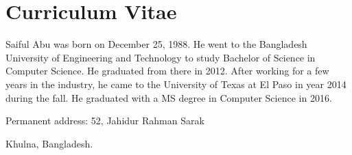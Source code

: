 
\chapter*{Curriculum Vitae}

Saiful Abu was born on December 25, 1988. He went to the Bangladesh University of Engineering and Technology to study Bachelor of Science in Computer Science. He graduated from there in 2012. After working for a few years in the industry, he came to the University of Texas at El Paso in year 2014 during the fall. He graduated with a MS degree in Computer Science in 2016.



\medskip

\noindent
Permanent address: 52, Jahidur Rahman Sarak

\noindent
\hspace{1.42in}
Khulna, Bangladesh.

\vfill



